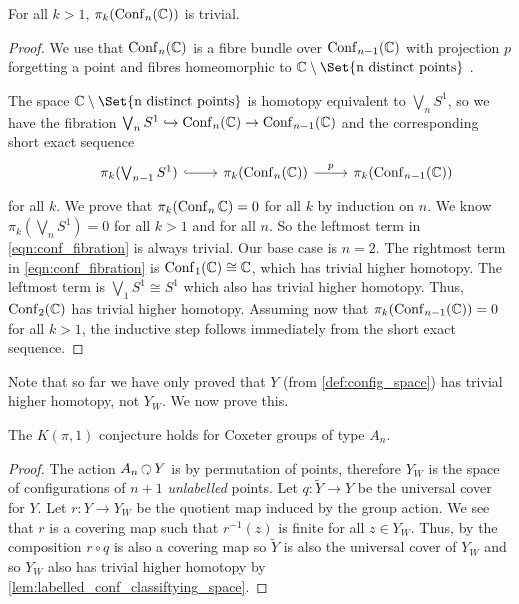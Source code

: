 \documentclass[class=article, crop=false]{standalone}
\begin{document}
\begin{lemma}
	For all $k>1$, $\pi_k(\operatorname{Conf}_n(\mathbb{C}))$ is trivial.
	\label{lem:labelled_conf_classiftying_space}
\end{lemma}
\begin{proof}
	We use that $\operatorname{Conf}_n(\mathbb{C})$ is a fibre bundle over $\operatorname{Conf}_{n-1}(\mathbb{C})$ with projection $p$ forgetting a point and fibres homeomorphic to $\C \setminus \Set{\text{n distinct points}}$ \cite[Theorem 3]{fadell_neuwirth_configuration_1962}.

The space $\C \setminus \Set{\text{n distinct points}}$ is homotopy equivalent to $\bigvee_n S^1$, so we have the fibration $\bigvee_n S^1 \hookrightarrow \operatorname{Conf}_n(\mathbb{C}) \to \operatorname{Conf}_{n-1}(\mathbb{C})$ and the corresponding short exact sequence
\begin{equation}
	\begin{tikzcd}
		&\pi_k(\bigvee_{n-1} S^1) \arrow[hook]{r} &\pi_k(\conf_n(\C)) \arrow{r}{p} &\pi_k(\conf_{n-1}(\C))
	\end{tikzcd}
	\label{eqn:conf_fibration}
\end{equation}
for all $k$.
We prove that $\pi_k(\operatorname{Conf}_n{\mathbb{C}})=0$ for all $k$ by induction on $n$. We know $\pi_k(\bigvee_nS^1)=0$ for all $k>1$ and for all $n$. So the leftmost term in \eqref{eqn:conf_fibration} is always trivial. Our base case is $n=2$. The rightmost term in \eqref{eqn:conf_fibration} is $\operatorname{Conf}_1(\mathbb{C}) \cong \mathbb{C}$, which has trivial higher homotopy. The leftmost term is $\bigvee_1 S^1 \cong S^1$ which also has trivial higher homotopy. Thus, $\operatorname{Conf}_2(\mathbb{C})$ has trivial higher homotopy. Assuming now that $\pi_k(\operatorname{Conf}_{n-1}(\mathbb{C})) = 0$ for all $k>1$, the inductive step follows immediately from the short exact sequence.
\end{proof}

Note that so far we have only proved that $Y$ (from \cref{def:config_space}) has trivial higher homotopy, not $Y_W$. We now prove this.

\begin{theorem}
	The $K(\pi,1)$ conjecture holds for Coxeter groups of type $A_n$.
\end{theorem}
\begin{proof}
	The action $A_n \acts Y$ is by permutation of points, therefore $Y_W$ is the space of configurations of $n+1$ \emph{unlabelled} points. Let $q \colon \widetilde{Y} \to Y$ be the universal cover for $Y$. Let $r \colon Y \to Y_W$ be the quotient map induced by the group action. We see that $r$ is a covering map such that $r^{-1}(z)$ is finite for all $z \in Y_W$. Thus, by \cite[Exercise 53.4]{munkres_topology_2000}
	the composition $r \circ q$ is also a covering map so $\widetilde{Y}$ is also the universal cover of $Y_W$ and so $Y_W$ also has trivial higher homotopy by \cref{lem:labelled_conf_classiftying_space}.
\end{proof}
\end{document}
